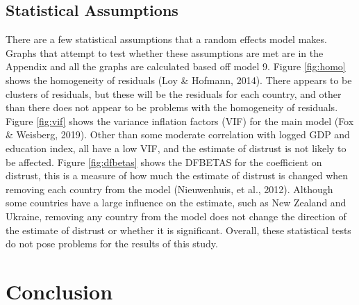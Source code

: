 \documentclass[
  11pt,
]{article}
\begin{document}
\hypertarget{statistical-assumptions}{%
\subsection{Statistical Assumptions}\label{statistical-assumptions}}

There are a few statistical assumptions that a random effects model makes. Graphs that attempt to test whether these assumptions are met are in the Appendix and all the graphs are calculated based off model 9. Figure \ref{fig:homo} shows the homogeneity of residuals (Loy \& Hofmann, 2014). There appears to be clusters of residuals, but these will be the residuals for each country, and other than there does not appear to be problems with the homogeneity of residuals. Figure \ref{fig:vif} shows the variance inflation factors (VIF) for the main model (Fox \& Weisberg, 2019). Other than some moderate correlation with logged GDP and education index, all have a low VIF, and the estimate of distrust is not likely to be affected. Figure \ref{fig:dfbetas} shows the DFBETAS for the coefficient on distrust, this is a measure of how much the estimate of distrust is changed when removing each country from the model (Nieuwenhuis, et al., 2012). Although some countries have a large influence on the estimate, such as New Zealand and Ukraine, removing any country from the model does not change the direction of the estimate of distrust or whether it is significant. Overall, these statistical tests do not pose problems for the results of this study.\\

\hypertarget{conclusion}{%
\section{Conclusion}\label{conclusion}}
\end{document}
